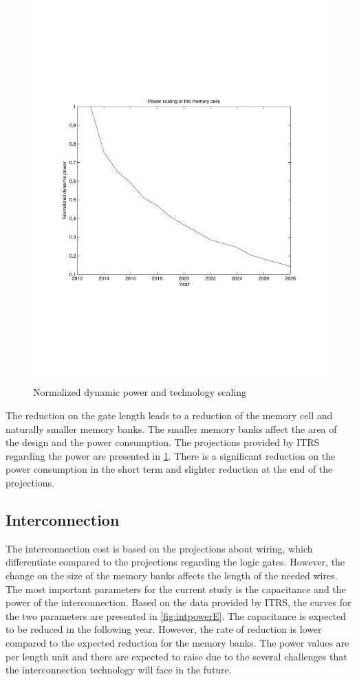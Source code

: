  \begin{figure}
 \centering
 \includegraphics[width = \textwidth]{E/cellpower.pdf}
  \caption{Normalized dynamic power and technology scaling}
 \label{fig:powerE}
 \end{figure}

The reduction on the gate length leads to a reduction of the memory cell and naturally smaller memory banks.
The smaller memory banks affect the area of the design and the power consumption.
The projections provided by ITRS regarding the power are presented in \ref{fig:powerE}. 
There is a significant reduction on the power consumption in the short term and slighter reduction at the end of the projections.

\subsection{Interconnection}

The interconnection cost is based on the projections about wiring, which differentiate compared to the projections regarding the logic gates.
However, the change on the size of the memory banks affects the length of the needed wires.
The most important parameters for the current study is the capacitance and the power of the interconnection.
Based on the data provided by ITRS, the curves for the two parameters are presented in \ref{fig:intpowerE}.
The capacitance is expected to be reduced in the following year.
However, the rate of reduction is lower compared to the expected reduction for the memory banks.
The power values are per length unit and there are expected to raise due to the several challenges that the interconnection technology will face in the future.

